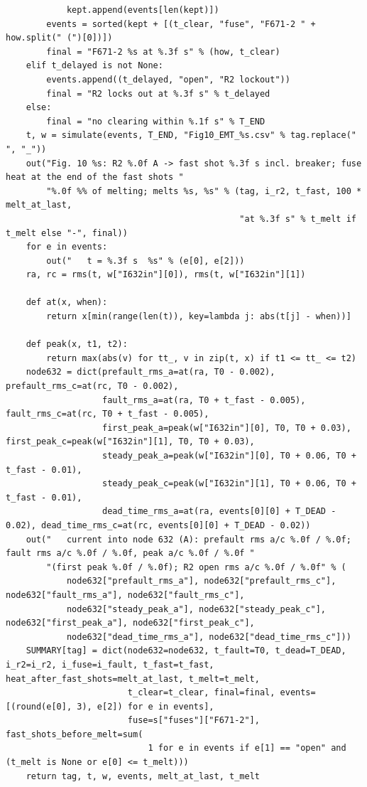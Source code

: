 \documentclass[12pt,a4paper]{article}
\begin{document}
\begin{lstlisting}
            kept.append(events[len(kept)])
        events = sorted(kept + [(t_clear, "fuse", "F671-2 " + how.split(" (")[0])])
        final = "F671-2 %s at %.3f s" % (how, t_clear)
    elif t_delayed is not None:
        events.append((t_delayed, "open", "R2 lockout"))
        final = "R2 locks out at %.3f s" % t_delayed
    else:
        final = "no clearing within %.1f s" % T_END
    t, w = simulate(events, T_END, "Fig10_EMT_%s.csv" % tag.replace(" ", "_"))
    out("Fig. 10 %s: R2 %.0f A -> fast shot %.3f s incl. breaker; fuse heat at the end of the fast shots "
        "%.0f %% of melting; melts %s, %s" % (tag, i_r2, t_fast, 100 * melt_at_last,
                                              "at %.3f s" % t_melt if t_melt else "-", final))
    for e in events:
        out("   t = %.3f s  %s" % (e[0], e[2]))
    ra, rc = rms(t, w["I632in"][0]), rms(t, w["I632in"][1])

    def at(x, when):
        return x[min(range(len(t)), key=lambda j: abs(t[j] - when))]

    def peak(x, t1, t2):
        return max(abs(v) for tt_, v in zip(t, x) if t1 <= tt_ <= t2)
    node632 = dict(prefault_rms_a=at(ra, T0 - 0.002), prefault_rms_c=at(rc, T0 - 0.002),
                   fault_rms_a=at(ra, T0 + t_fast - 0.005), fault_rms_c=at(rc, T0 + t_fast - 0.005),
                   first_peak_a=peak(w["I632in"][0], T0, T0 + 0.03), first_peak_c=peak(w["I632in"][1], T0, T0 + 0.03),
                   steady_peak_a=peak(w["I632in"][0], T0 + 0.06, T0 + t_fast - 0.01),
                   steady_peak_c=peak(w["I632in"][1], T0 + 0.06, T0 + t_fast - 0.01),
                   dead_time_rms_a=at(ra, events[0][0] + T_DEAD - 0.02), dead_time_rms_c=at(rc, events[0][0] + T_DEAD - 0.02))
    out("   current into node 632 (A): prefault rms a/c %.0f / %.0f; fault rms a/c %.0f / %.0f, peak a/c %.0f / %.0f "
        "(first peak %.0f / %.0f); R2 open rms a/c %.0f / %.0f" % (
            node632["prefault_rms_a"], node632["prefault_rms_c"], node632["fault_rms_a"], node632["fault_rms_c"],
            node632["steady_peak_a"], node632["steady_peak_c"], node632["first_peak_a"], node632["first_peak_c"],
            node632["dead_time_rms_a"], node632["dead_time_rms_c"]))
    SUMMARY[tag] = dict(node632=node632, t_fault=T0, t_dead=T_DEAD, i_r2=i_r2, i_fuse=i_fault, t_fast=t_fast, heat_after_fast_shots=melt_at_last, t_melt=t_melt,
                        t_clear=t_clear, final=final, events=[(round(e[0], 3), e[2]) for e in events],
                        fuse=s["fuses"]["F671-2"], fast_shots_before_melt=sum(
                            1 for e in events if e[1] == "open" and (t_melt is None or e[0] <= t_melt)))
    return tag, t, w, events, melt_at_last, t_melt



\end{lstlisting}
\end{document}
